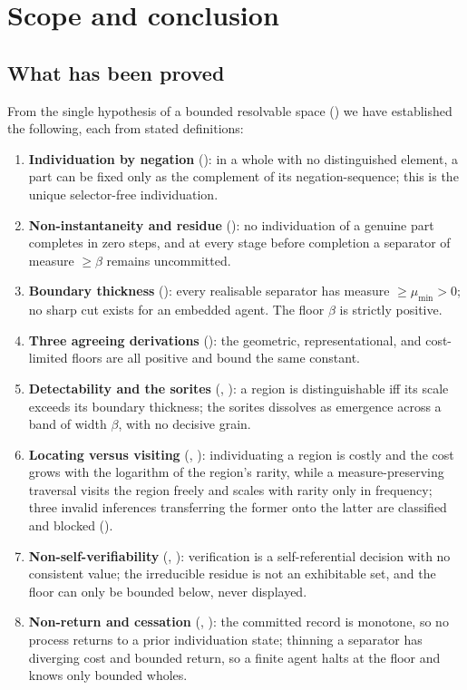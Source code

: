 \documentclass[11pt,a4paper]{article}
\theoremstyle{thmstyle}
\theoremstyle{definition}
\theoremstyle{remark}
\newcommand{\thick}{\beta}
\begin{document}
\section{Scope and conclusion}
\label{sec:scope}

\subsection{What has been proved}

From the single hypothesis of a bounded resolvable space () we have
established the following, each from stated definitions:

\begin{enumerate}[label=(\arabic*),leftmargin=2.4em]
\item \textbf{Individuation by negation} (): in a whole
with no distinguished element, a part can be fixed only as the complement of its
negation-sequence; this is the unique selector-free individuation.
\item \textbf{Non-instantaneity and residue} (): no
individuation of a genuine part completes in zero steps, and at every stage before
completion a separator of measure $\ge\thick$ remains uncommitted.
\item \textbf{Boundary thickness} (): every realisable
separator has measure $\ge\mu_{\min}>0$; no sharp cut exists for an embedded
agent. The floor $\thick$ is strictly positive.
\item \textbf{Three agreeing derivations} (): the
geometric, representational, and cost-limited floors are all positive and bound
the same constant.
\item \textbf{Detectability and the sorites} (,
): a region is distinguishable iff its scale exceeds its
boundary thickness; the sorites dissolves as emergence across a band of width
$\thick$, with no decisive grain.
\item \textbf{Locating versus visiting} (,
): individuating a region is costly and the cost grows
with the logarithm of the region's rarity, while a measure-preserving traversal
visits the region freely and scales with rarity only in frequency; three invalid
inferences transferring the former onto the latter are classified and blocked
().
\item \textbf{Non-self-verifiability} (,
): verification is a self-referential decision with
no consistent value; the irreducible residue is not an exhibitable set, and the
floor can only be bounded below, never displayed.
\item \textbf{Non-return and cessation} (,
): the committed record is monotone, so no process returns to
a prior individuation state; thinning a separator has diverging cost and bounded
return, so a finite agent halts at the floor and knows only bounded wholes.
\end{enumerate}
\end{document}
